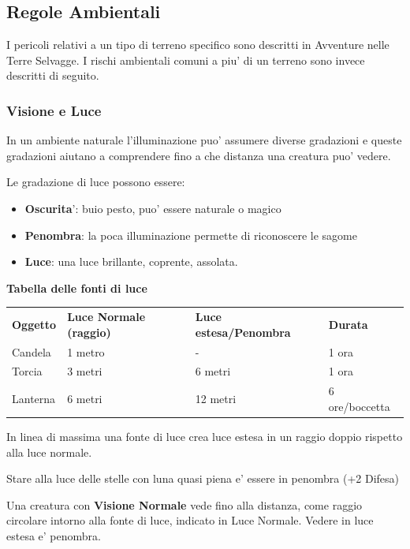 \documentclass[a4paper,11pt,twoside,openany]{book}
\begin{document}
{\subsection{Regole Ambientali}

\label{regole-ambientali}

I pericoli relativi a un tipo di terreno specifico sono descritti in Avventure nelle Terre Selvagge. I rischi ambientali comuni a piu' di un terreno sono invece descritti di seguito.

\subsubsection{Visione e Luce}

\label{visione-e-luce}

In un ambiente naturale l'illuminazione puo' assumere diverse gradazioni e queste gradazioni aiutano a comprendere fino a che distanza una creatura puo' vedere.

Le gradazione di luce possono essere:
\begin{itemize}
\item 
\textbf{Oscurita}': buio pesto, puo' essere naturale o magico 
\item 
\textbf{Penombra}: la poca illuminazione permette di riconoscere le
sagome 
\item 
\textbf{Luce}: una luce brillante, coprente, assolata. 
\end{itemize}

\medskip

\textbf{Tabella delle fonti di luce}

\medskip


\begin{tabular}{llll}
\toprule
\textbf{Oggetto} & \textbf{Luce Normale (raggio)} & \textbf{Luce estesa/Penombra} & \textbf{Durata}\tabularnewline
Candela & 1 metro & - & 1 ora\tabularnewline
Torcia & 3 metri & 6 metri & 1 ora\tabularnewline
Lanterna & 6 metri & 12 metri & 6 ore/boccetta\tabularnewline
\end{tabular}

\bigskip

In linea di massima una fonte di luce crea luce estesa in un raggio doppio rispetto alla luce normale.

Stare alla luce delle stelle con luna quasi piena e' essere in penombra (+2 Difesa)

Una creatura con \textbf{Visione Normale} vede fino alla distanza, come raggio circolare intorno alla fonte di luce, indicato in Luce Normale. Vedere in luce estesa e' penombra.

}
\end{document}
